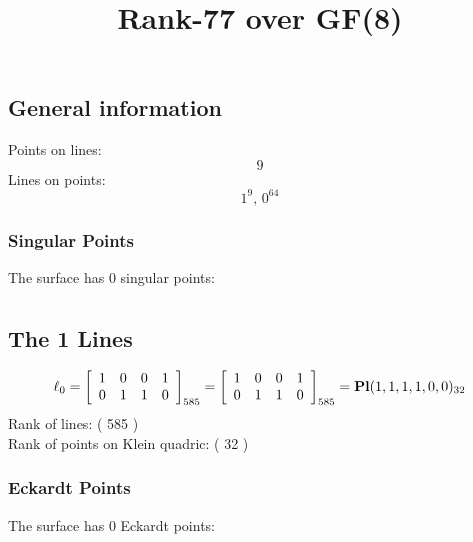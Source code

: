 \documentclass{article}
\newcommand\setTBstruts{\def\T{\rule{0pt}{2.6ex}}%
\def\B{\rule[-1.2ex]{0pt}{0pt}}}
\begin{document}
 
\setTBstruts



{\allowdisplaybreaks%






\title{Rank-77 over GF(8)}
\author{}%
\maketitle%
%
{}



\subsection*{General information}
Points on lines:
$$
9$$
Lines on points:
$$
1^9,\,0^{64}$$
\subsubsection*{Singular Points}
The surface has 0 singular points:\\
\begin{align*}
\end{align*}
\subsection*{The 1 Lines}
$$
\ell_{0} = 
\left[
\begin{array}{*{4}{r}}
1 & 0 & 0 & 1\\
0 & 1 & 1 & 0\\
\end{array}
\right]
_{585}
=
\left[
\begin{array}{*{4}c}
1  & 0  & 0  & 1\\
0  & 1  & 1  & 0\\
\end{array}
\right]_{585}
={\rm\bf Pl}(1,1,1,1,0,0 )_{32}$$
Rank of lines: ( 585 )\\
Rank of points on Klein quadric: ( 32 )\\
\subsubsection*{Eckardt Points}
The surface has 0 Eckardt points:\\
}
\end{document}
